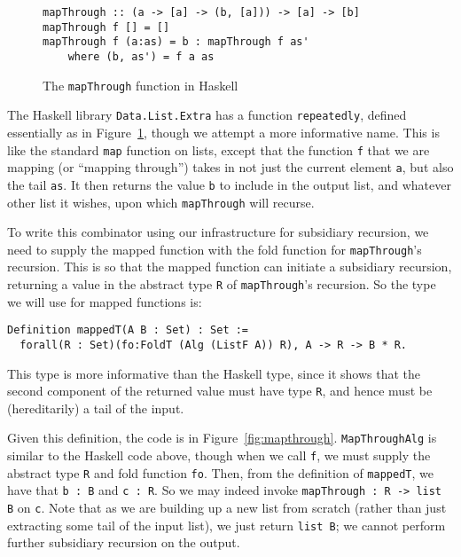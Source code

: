 \documentclass[a4paper,USenglish]{lipics-v2021}
\begin{document}
\begin{figure}
\begin{verbatim}
mapThrough :: (a -> [a] -> (b, [a])) -> [a] -> [b]
mapThrough f [] = []
mapThrough f (a:as) = b : mapThrough f as'
    where (b, as') = f a as
\end{verbatim}
\caption{The \texttt{mapThrough} function in Haskell}
\label{fig:mapthroughhs}
\end{figure}

The Haskell library \verb|Data.List.Extra| has a function
\verb|repeatedly|, defined essentially as in
Figure~\ref{fig:mapthroughhs}, though we attempt a more informative
name.  This is like the standard \verb|map| function on lists, except
that the function \verb|f| that we are mapping (or ``mapping
through'') takes in not just the current element \verb|a|, but also
the tail \verb|as|.  It then returns the value \verb|b| to include in
the output list, and whatever other list it wishes, upon which
\verb|mapThrough| will recurse.

To write this combinator using our infrastructure for subsidiary
recursion, we need to supply the mapped function with the fold
function for \verb|mapThrough|'s recursion.  This is so that the
mapped function can initiate a subsidiary recursion, returning a value
in the abstract type \verb|R| of \verb|mapThrough|'s recursion.  So
the type we will use for mapped functions is:
\begin{verbatim}
Definition mappedT(A B : Set) : Set :=
  forall(R : Set)(fo:FoldT (Alg (ListF A)) R), A -> R -> B * R.
\end{verbatim}
\noindent This type is more informative than the Haskell type,
since it shows that the second component of the returned value
must have type \verb|R|, and hence must be (hereditarily) a tail
of the input.

Given this definition, the code is in Figure~\ref{fig:mapthrough}.  
\verb|MapThroughAlg| is similar to the
Haskell code above, though when we call \verb|f|, we must
supply the abstract type \verb|R| and fold function \verb|fo|.  Then,
from the definition of \verb|mappedT|, we have that \verb|b : B| and
\verb|c : R|.  So we may indeed invoke \verb|mapThrough : R -> list B|
on \verb|c|.  Note that as we are building up a new list from scratch
(rather than just extracting some tail of the input list), we just
return \verb|list B|; we cannot perform further subsidiary recursion
on the output.  
\end{document}
